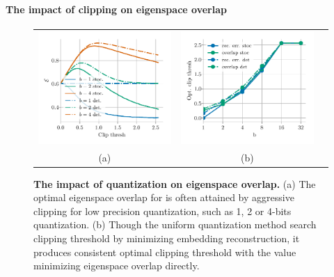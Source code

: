 \paragraph{The impact of clipping on eigenspace overlap} 
\begin{figure}
\begin{tabular}{c c c}
	\includegraphics[width=0.45\linewidth]{figures/micro_overlap_and_clipping.pdf} &
	\includegraphics[width=0.45\linewidth]{figures/optimal_clip_thresh_and_bits.pdf}  \\
	(a) & (b)
\end{tabular}
\label{fig:clipping_effect}
\caption{\textbf{The impact of quantization on eigenspace overlap.} (a) The optimal eigenspace overlap for is often attained by aggressive clipping for low precision quantization, such as 1, 2 or 4-bits quantization. (b) Though the uniform quantization method search clipping threshold by minimizing embedding reconstruction, it produces consistent optimal clipping threshold with the value minimizing eigenspace overlap directly.}	
\end{figure}

